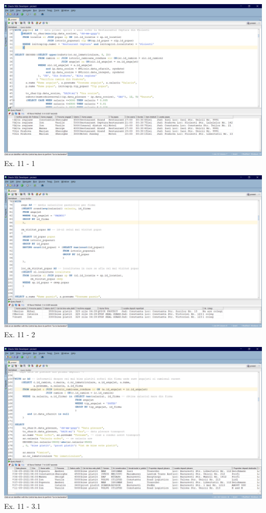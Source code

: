 \documentclass[12pt, a4paper]{article}
\begin{document}
\includegraphics[width=\textwidth]{ex11_1.png}
\label{Ex11 1}
\centering Ex. 11 - 1

\includegraphics[width=\textwidth]{ex11_2.png}
\label{Ex11 2}
\centering Ex. 11 - 2

\includegraphics[width=\textwidth]{ex11_3_1.png}
\label{Ex11 3.1}
\centering Ex. 11 - 3.1
\end{document}
